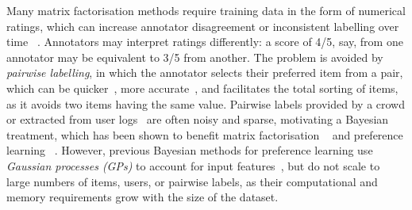 Many matrix factorisation methods %
require training data in the form of numerical ratings, 
which can increase annotator disagreement or inconsistent labelling over time
~\citep{ovadia2004ratings,yannakakis2011ranking}. Annotators may interpret ratings
differently: a score of 4/5, say, from one annotator may be equivalent to 3/5 from another. 
The problem is avoided by \emph{pairwise labelling}, 
in which the annotator selects their preferred item from a pair,
which can be quicker~\citep{kendall1948rank,kingsley2010preference,yang2011ranking},
more accurate~\citep{kiritchenko2017best},
and facilitates the total sorting of items, as it avoids two items having the same value.
Pairwise labels provided by a crowd
or extracted from user logs~\citep{joachims2002optimizing} are often noisy and sparse,
motivating
a Bayesian treatment, %
which has been shown to benefit matrix factorisation
~\citep{salakhutdinov2008bayesian}
and preference learning%
~\citep{chen2013pairwise}.
However, previous Bayesian methods for preference learning use
\emph{Gaussian processes (GPs)} to account for input
features~\citep{chu2005preference,houlsby2012collaborative,khan2014scalable},
but do not scale to large numbers of items, users, or
pairwise labels, 
as their computational and memory requirements grow with the size of the dataset.

